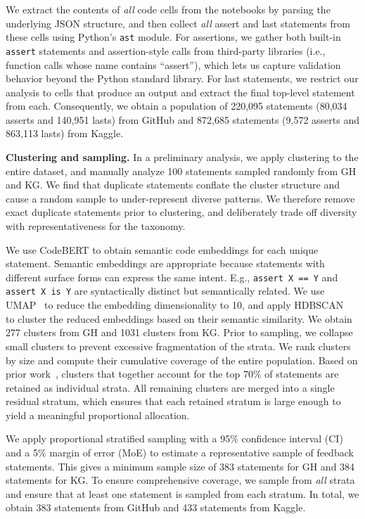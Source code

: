\documentclass[a4paper,USenglish,cleveref,autoref,thm-restate,anonymous]{lipics-v2021}       %
\begin{document}
We extract the contents of \emph{all} code cells from the notebooks
by parsing the underlying JSON structure,
and then collect \emph{all} assert and last statements from these cells
using Python's \lstinline{ast} module.
For assertions, we gather both built-in \lstinline{assert} statements
and assertion-style calls from third-party libraries
(i.e., function calls whose name contains ``assert''),
which lets us capture validation behavior beyond the Python standard library.
For last statements, we restrict our analysis to cells that produce an output
and extract the final top-level statement from each.
Consequently, we obtain a population of
220,095 statements (80,034 asserts and 140,951 lasts) from GitHub
and 872,685 statements (9,572 asserts and 863,113 lasts) from Kaggle.

\textbf{Clustering and sampling.}
In a preliminary analysis,
we apply clustering to the entire dataset,
and manually analyze 100 statements sampled randomly from GH and KG.
We find that duplicate statements conflate the cluster structure
and cause a random sample to under-represent diverse patterns.
We therefore remove exact duplicate statements prior to clustering,
and deliberately trade off diversity with representativeness for the taxonomy.

We use CodeBERT to obtain semantic code embeddings for each unique statement.
Semantic embeddings are appropriate
because statements with different surface forms can express the same intent.
E.g., \lstinline{assert X == Y} and \lstinline{assert X is Y}
are syntactically distinct but semantically related.
We use UMAP~\cite{mcinnes2018} to reduce the embedding dimensionality to 10,
and apply HDBSCAN~\cite{mcinnes2017} to cluster the reduced embeddings
based on their semantic similarity.
We obtain 277 clusters from GH and 1031 clusters from KG.
Prior to sampling,
we collapse small clusters to prevent excessive fragmentation of the strata.
We rank clusters by size
and compute their cumulative coverage of the entire population.
Based on prior work~\cite{wang2025why},
clusters that together account for the top 70\% of statements
are retained as individual strata.
All remaining clusters are merged into a single residual stratum,
which ensures that each retained stratum
is large enough to yield a meaningful proportional allocation.

We apply proportional stratified sampling
with a 95\% confidence interval (CI)
and a 5\% margin of error (MoE)
to estimate a representative sample of feedback statements.
This gives a minimum sample size of 383 statements for GH
and 384 statements for KG.
To ensure comprehensive coverage,
we sample from \emph{all} strata
and ensure that at least one statement is sampled from each stratum.
In total, we obtain 383 statements from GitHub
and 433 statements from Kaggle.
\end{document}
